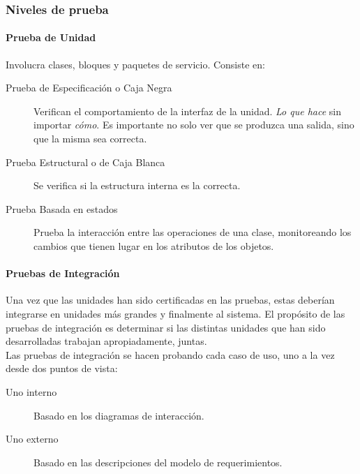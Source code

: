 \subsubsection{Niveles de prueba}
\paragraph{Prueba de Unidad}
Involucra clases, bloques y paquetes de servicio. Consiste en:
\begin{description}
	\item[Prueba de Especificación o Caja Negra] Verifican el comportamiento de la interfaz de la unidad. \emph{Lo que hace} sin importar \emph{cómo}. Es importante no solo ver que se produzca una salida, sino que la misma sea correcta.
	\item[Prueba Estructural o de Caja Blanca] Se verifica si la estructura interna es la correcta.
	\item[Prueba Basada en estados] Prueba la interacción entre las operaciones de una clase, monitoreando los cambios que tienen lugar en los atributos de los objetos.
\end{description}
\paragraph{Pruebas de Integración}
Una vez que las unidades han sido certificadas en las pruebas, estas deberían integrarse en unidades más grandes y finalmente al sistema. El propósito de las pruebas de integración es determinar si las distintas unidades que han sido desarrolladas trabajan apropiadamente, juntas.\\
Las pruebas de integración se hacen probando cada caso de uso, uno a la vez desde dos puntos de vista:
\begin{description}
	\item[Uno interno] Basado en los diagramas de interacción.
	\item[Uno externo] Basado en las descripciones del modelo de requerimientos.
\end{description}
